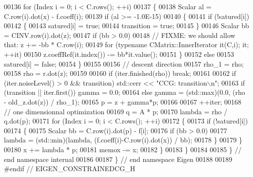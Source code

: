 \begin{DoxyCode}
00136     \textcolor{keywordflow}{for} (Index i = 0; i < C.rows(); ++i)
00137     \{
00138       Scalar al = C.row(i).dot(x) - f.coeff(i);
00139       \textcolor{keywordflow}{if} (al >= -1.0E-15)
00140       \{
00141         \textcolor{keywordflow}{if} (!satured[i])
00142         \{
00143           satured[i] = \textcolor{keyword}{true};
00144           transition = \textcolor{keyword}{true};
00145         \}
00146         Scalar bb = CINV.row(i).dot(z);
00147         \textcolor{keywordflow}{if} (bb > 0.0)
00148           \textcolor{comment}{// FIXME: we should allow that: z += -bb * C.row(i);}
00149           \textcolor{keywordflow}{for} (\textcolor{keyword}{typename} CMatrix::InnerIterator it(C,i); it; ++it)
00150             z.coeffRef(it.index()) -= bb*it.value();
00151       \}
00152       \textcolor{keywordflow}{else}
00153         satured[i] = \textcolor{keyword}{false};
00154     \}
00155 
00156     \textcolor{comment}{// descent direction}
00157     rho\_1 = rho;
00158     rho = r.dot(z);
00159 
00160     \textcolor{keywordflow}{if} (iter.finished(rho)) \textcolor{keywordflow}{break};
00161 
00162     \textcolor{keywordflow}{if} (iter.noiseLevel() > 0 && transition) std::cerr << \textcolor{stringliteral}{"CCG: transition\(\backslash\)n"};
00163     \textcolor{keywordflow}{if} (transition || iter.first()) gamma = 0.0;
00164     \textcolor{keywordflow}{else} gamma = (std::max)(0.0, (rho - old\_z.dot(z)) / rho\_1);
00165     p = z + gamma*p;
00166 
00167     ++iter;
00168     \textcolor{comment}{// one dimensionnal optimization}
00169     q = A * p;
00170     lambda = rho / q.dot(p);
00171     \textcolor{keywordflow}{for} (Index i = 0; i < C.rows(); ++i)
00172     \{
00173       \textcolor{keywordflow}{if} (!satured[i])
00174       \{
00175         Scalar bb = C.row(i).dot(p) - f[i];
00176         \textcolor{keywordflow}{if} (bb > 0.0)
00177           lambda = (std::min)(lambda, (f.coeff(i)-C.row(i).dot(x)) / bb);
00178       \}
00179     \}
00180     x += lambda * p;
00181     memox -= x;
00182   \}
00183 \}
00184 
00185 \} \textcolor{comment}{// end namespace internal}
00186 
00187 \} \textcolor{comment}{// end namespace Eigen}
00188 
00189 \textcolor{preprocessor}{#endif // EIGEN\_CONSTRAINEDCG\_H}
\end{DoxyCode}
